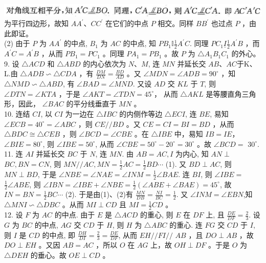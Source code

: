 \documentclass[10pt]{article}
\begin{document}
\includegraphics[max width=\textwidth]{2024_10_30_2c8f45efd4a519b08e1ag-167}为平行四边形，故知 $A A^{\prime} 、 C C^{\prime}$ 在它们的中点 $P$ 相交。同样 $B B^{\prime}$ 也过点 $P$ ，由此即证。\\
(2) 由于 $P$ 为 $A A^{\prime}$ 的中点, $B_{1}$ 为 $A C$ 的中点, 知 $P B_{1} \mathbb{I} \frac{1}{2} A^{\prime} C$. 同理 $P C_{1} \underline{I} \frac{1}{2} A^{\prime} B$ ，而 $A^{\prime} C=A^{\prime} B$ ，从而 $P B_{1}=P C_{1}$ 。同理 $P A_{1}=P B_{1}$ 。故 $P$ 为 $\triangle A_{1} B_{1} C_{1}$ 的外心。\\
9. 设 $\triangle A C D$ 和 $\triangle A B D$ 的内心依次为 $N 、 M$, 连 $M N$ 并延长交 $A B 、 A C$于K、L.由 $\triangle A D B \backsim \triangle C D A$ ，有 $\frac{D M}{D N}=\frac{B D}{A D}$ 。又 $\angle M D N=\angle A D B=90^{\circ}$ ，知 $\triangle N M D \backsim \triangle A B D$, 有 $\angle B A D=\angle M N D$. 又设 $A D$ 交 $K L$ 于 $T$, 则\\
$\angle D T N=\angle K T A$ ，于是 $\angle A K T=\angle T D N=45^{\circ} ，$ 从而 $\triangle A K L$ 是等腰直角三角形，因此， $\angle B A C$ 的平分线垂直于 $M N$ 。\\
10. 连结 $C I$, 以 $C I$ 为一边在 $\triangle I B C$ 的内侧作等边 $\triangle E C I$, 连 $B E$, 易知 $\angle E C B=40^{\circ}=\angle A B C$ ，则 $C E / / B D$ 。又 $C E=C I=B I=B D$ ，从而 $\triangle B D C \cong \triangle C E B$ ，则 $\angle B C D=\angle C B E$ 。在 $\triangle I B E$ 中，易知 $I B=I E ，$ $\angle B I E=80^{\circ}$, 则 $\angle I B E=50^{\circ}$, 从而 $\angle C B E=50^{\circ}-20^{\circ}=30^{\circ}$ 。故 $\angle B C D=$ $30^{\circ}$.\\
11. 连 $A I$ 并延长交 $B C$ 于 $N$, 连 $M N$. 由 $A B=A C, I$ 为内心, 知 $A N \perp$ $B C, B N=C N$, 则 $M N / / A C, M N=\frac{1}{2} A C=\frac{1}{2} B D \cdots$ (1). 又 $B D \perp A C$, 则 $M N \perp B D$, 于是 $\angle N B E=\angle N A E=\angle I N M=\frac{1}{2} \angle B A E$. 连 $B I$, 则 $\angle I B E=$ $\frac{1}{2} \angle A B E$, 则 $\angle I B N=\angle I B E+\angle N B E=\frac{1}{2}(\angle A B E+\angle B A E)=45^{\circ}$, 故 $I N=B N=\frac{1}{2} B C \cdots$ (2). 于是由(1)、(2)有 $\frac{M N}{D B}=\frac{N I}{B C}=\frac{1}{2}$. 又 $\angle I N M=\angle E B N$,知 $\triangle M N I \backsim \triangle D B C$ 。从而 $M I \perp C D$ 且 $M I=\frac{1}{2} C D$ 。\\
12. 设 $F$ 为 $A C$ 的中点. 由于 $E$ 是 $\triangle A C D$ 的重心, 则 $E$ 在 $D F$ 上, 且 $\frac{D E}{D F}=\frac{2}{3}$. 设 $G$ 为 $B C$ 的中点, $A G$ 交 $C D$ 于 $H$, 则 $H$ 为 $\triangle A B C$ 的重心. 连 $F G$ 交 $C D$ 于 $I$, 则 $I$ 是 $C D$ 的中点, 即 $\frac{D H}{D I}=\frac{2}{3}=\frac{D E}{D F}$, 从而 $E H / / F I / /$ $A B$ ，且 $D O \perp A B$ ，故 $D O \perp E H$ 。又因 $A B=A C$ ，所以 $O$ 在 $A G$ 上，故 $O H \perp D F$ 。于是 $O$ 为 $\triangle D E H$ 的垂心。故 $O E \perp C D$ 。\\
\end{document}
